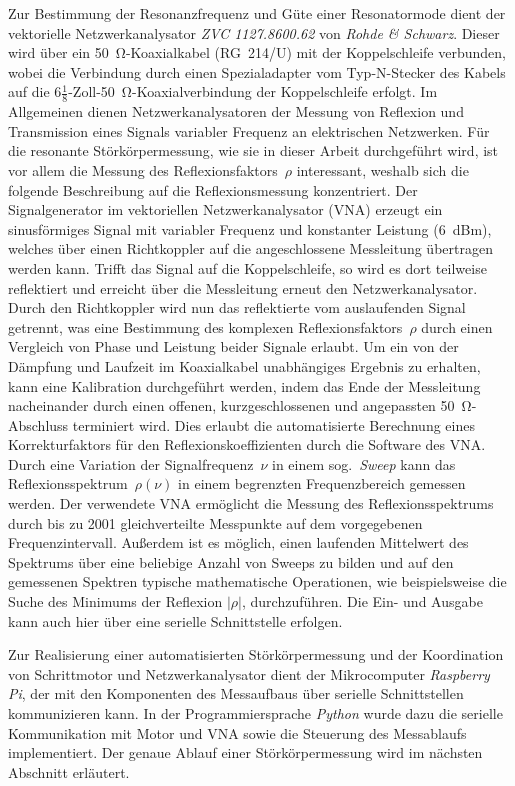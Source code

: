 Zur Bestimmung der Resonanzfrequenz und Güte einer Resonatormode dient der vektorielle Netzwerkanalysator \textit{ZVC 1127.8600.62} von \textit{Rohde \& Schwarz}.
Dieser wird über ein \SI{50}{\ohm}-Koaxialkabel (RG~214/U) mit der Koppelschleife verbunden, wobei die Verbindung durch einen Spezialadapter vom Typ-N-Stecker des Kabels auf die $6\tfrac{1}{8}$-Zoll-\SI{50}{\ohm}-Koaxialverbindung der Koppelschleife erfolgt.
Im Allgemeinen dienen Netzwerkanalysatoren der Messung von Reflexion und Transmission eines Signals variabler Frequenz an elektrischen Netzwerken.
Für die resonante Störkörpermessung, wie sie in dieser Arbeit durchgeführt wird, ist vor allem die Messung des Reflexionsfaktors~$\rho$ interessant, weshalb sich die folgende Beschreibung auf die Reflexionsmessung konzentriert.
Der Signalgenerator im vektoriellen Netzwerkanalysator (VNA) erzeugt ein sinusförmiges Signal mit variabler Frequenz und konstanter Leistung (\SI{6}{dBm}), welches über einen Richtkoppler auf die angeschlossene Messleitung übertragen werden kann.
Trifft das Signal auf die Koppelschleife, so wird es dort teilweise reflektiert und erreicht über die Messleitung erneut den Netzwerkanalysator.
Durch den Richtkoppler wird nun das reflektierte vom auslaufenden Signal getrennt, was eine Bestimmung des komplexen Reflexionsfaktors~$\rho$ durch einen Vergleich von Phase und Leistung beider Signale erlaubt.
Um ein von der Dämpfung und Laufzeit im Koaxialkabel unabhängiges Ergebnis zu erhalten, kann eine Kalibration durchgeführt werden, indem das Ende der Messleitung nacheinander durch einen offenen, kurzgeschlossenen und angepassten \SI{50}{\ohm}-Abschluss terminiert wird.
Dies erlaubt die automatisierte Berechnung eines Korrekturfaktors für den Reflexionskoeffizienten durch die Software des VNA.
Durch eine Variation der Signalfrequenz~$\nu$ in einem sog.\ \textit{Sweep} kann das Reflexionsspektrum~$\rho(\nu)$ in einem begrenzten Frequenzbereich gemessen werden.
Der verwendete VNA ermöglicht die Messung des Reflexionsspektrums durch bis zu 2001 gleichverteilte Messpunkte auf dem vorgegebenen Frequenzintervall.
Außerdem ist es möglich, einen laufenden Mittelwert des Spektrums über eine beliebige Anzahl von Sweeps zu bilden und auf den gemessenen Spektren typische mathematische Operationen, wie beispielsweise die Suche des Minimums der Reflexion $|\rho|$, durchzuführen.
Die Ein- und Ausgabe kann auch hier über eine serielle Schnittstelle erfolgen.

Zur Realisierung einer automatisierten Störkörpermessung und der Koordination von Schrittmotor und Netzwerkanalysator dient der Mikrocomputer \textit{Raspberry Pi}, der mit den Komponenten des Messaufbaus über serielle Schnittstellen kommunizieren kann.
In der Programmiersprache \textit{Python} wurde dazu die serielle Kommunikation mit Motor und VNA sowie die Steuerung des Messablaufs implementiert.
Der genaue Ablauf einer Störkörpermessung wird im nächsten Abschnitt erläutert.


